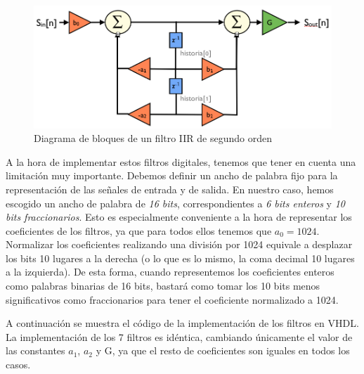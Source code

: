 \documentclass[a4paper,12pt]{report}
\begin{document}
\begin{figure}[hbt]
\includegraphics[width=\textwidth]{img/filter.png} 
\caption{Diagrama de bloques de un filtro IIR de segundo orden} \label{fig:filter_diagram}
\end{figure}

A la hora de implementar estos filtros digitales, tenemos que tener en cuenta una limitación muy importante. Debemos definir un ancho de palabra fijo para la representación de las señales de entrada y de salida. En nuestro caso, hemos escogido un ancho de palabra de \emph{16 bits}, correspondientes a \emph{6 bits enteros} y \emph{10 bits fraccionarios}. Esto es especialmente conveniente a la hora de representar los coeficientes de los filtros, ya que para todos ellos tenemos que $a_0 = 1024$. Normalizar los coeficientes realizando una división por 1024 equivale a desplazar los bits 10 lugares a la derecha (o lo que es lo mismo, la coma decimal 10 lugares a la izquierda). De esta forma, cuando representemos los coeficientes enteros como palabras binarias de 16 bits, bastará como tomar los 10 bits menos significativos como fraccionarios para tener el coeficiente normalizado a 1024.

A continuación se muestra el código de la implementación de los filtros en VHDL. La implementación de los 7 filtros es idéntica, cambiando únicamente el valor de las constantes $a_1$, $a_2$ y G, ya que el resto de coeficientes son iguales en todos los casos.
\end{document}
